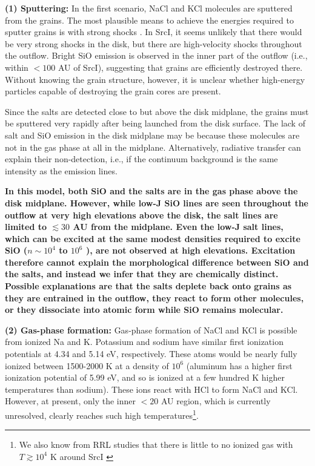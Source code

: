 \documentclass[twocolumn]{aastex62}
\newcommand{\sourcei}{SrcI\xspace}
\newcommand{\referee}[1]{\textbf{#1}}
\begin{document}
\textbf{(1) Sputtering:}
In the first scenario, NaCl and KCl molecules are sputtered from the grains.
The most plausible means to achieve the energies required to sputter grains is
with strong shocks \citep{Schilke1997a,Decin2016a}.  In \sourcei, it seems
unlikely that there would be very strong shocks in the disk, but there are
high-velocity shocks throughout the outflow.  Bright SiO emission is observed in
the inner part of the outflow (i.e., within $<100$ AU of \sourcei), suggesting
that grains are efficiently destroyed there.  Without knowing the grain
structure, however, it is unclear whether high-energy particles capable of
destroying the grain cores are present.

Since the salts are detected close to but above the disk midplane, the
grains must be sputtered very rapidly after being launched from the disk surface.
The lack of salt and SiO emission in the disk midplane may be because these
molecules are not in the gas phase at all in the midplane.  Alternatively,
radiative transfer can explain their non-detection, i.e., if the continuum
background is the same intensity as the emission lines.

\referee{
In this model, both SiO and the salts are in the gas phase above the disk
midplane. 
However, while low-J SiO lines are seen throughout the outflow at very high
elevations above the disk, the salt lines are limited to $\lesssim 30$ AU from
the midplane.  Even the low-J salt lines, which can be excited at the same
modest densities required to excite SiO  ($n\sim10^4$ to $10^6$ \percc), are
not observed at high elevations.  Excitation therefore cannot
explain the morphological difference between SiO and the salts, and instead we
infer that they are chemically distinct.  Possible explanations are that the salts
deplete back onto grains as they are entrained in the outflow, they react to
form other molecules, or they dissociate into atomic form while SiO remains
molecular.
}




\textbf{(2) Gas-phase formation:}
Gas-phase formation of NaCl and KCl is possible from ionized Na and K.
Potassium and sodium have similar first ionization potentials at 4.34 and 5.14
eV, respectively.  These atoms would be nearly fully ionized between 1500-2000
K at a density of $10^6$ \percc (aluminum has a higher first ionization
potential of 5.99 eV, and so is ionized at a few hundred K higher temperatures
than sodium).  These ions react with HCl to form NaCl and KCl.  However, at
present, only the inner $<20$ AU region, which is currently unresolved, clearly
reaches such high temperatures\footnote{We also know from RRL studies that
there is little to no ionized gas with $T\gtrsim10^4$ K around \sourcei
\citep{Plambeck2016a,Baez-Rubio2018a}}.  
\end{document}
